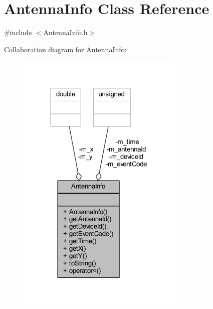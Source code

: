 \hypertarget{class_antenna_info}{}\section{Antenna\+Info Class Reference}
\label{class_antenna_info}


{\ttfamily \#include $<$Antenna\+Info.\+h$>$}



Collaboration diagram for Antenna\+Info\+:\nopagebreak
\begin{figure}[H]
\begin{center}
\leavevmode
\includegraphics[width=225pt]{class_antenna_info__coll__graph}
\end{center}
\end{figure}
